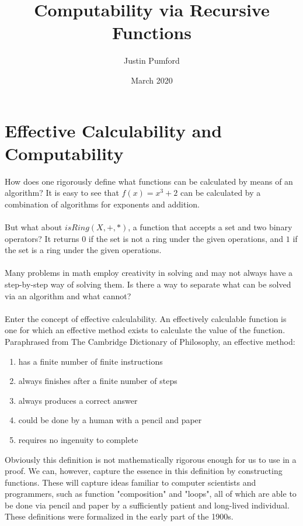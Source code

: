 \documentclass[12pt, letterpaper]{article}
\title{Computability via Recursive Functions}
\author{Justin Pumford  }
\date{March 2020}
\theoremstyle{case}
\begin{document}
  \maketitle

  \section{Effective Calculability and Computability}
    How does one rigorously define what functions can be calculated by means of an algorithm?
    It is easy to see that $f(x) = x^3 + 2$ can be calculated by a combination of algorithms for exponents
    and addition.
    \\
    \\
    But what about $isRing(X, +, *)$, a function that accepts a set and two binary operators?
    It returns $0$ if the set is not a ring under the given operations, and $1$ if the set is a ring under the given operations.
    \\
    \\
    Many problems in math employ creativity in solving and may not always have a step-by-step way of solving them.
    Is there a way to separate what can be solved via an algorithm and what cannot?
    \\
    \\
    Enter the concept of effective calculability. An effectively calculable function is one for which an effective method 
    exists to calculate the value of the function. Paraphrased from The Cambridge Dictionary of Philosophy, an effective method:
    \begin{enumerate}
      \item has a finite number of finite instructions
      \item always finishes after a finite number of steps
      \item always produces a correct answer
      \item could be done by a human with a pencil and paper
      \item requires no ingenuity to complete
    \end{enumerate}
    Obviously this definition is not mathematically rigorous enough for us to use in a proof.
    We can, however, capture the essence in this definition by constructing functions. These will capture ideas familiar
    to computer scientists and programmers, such as function "composition" and "loops", all of which are able to be done via pencil and 
    paper by a sufficiently patient and long-lived individual. These definitions were formalized in the early part of the 1900s.
\end{document}
